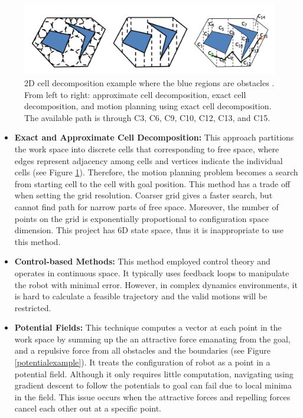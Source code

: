 \begin{figure}[H]
\centering
\includegraphics[width = \columnwidth]{background/cell.png}
\caption{2D cell decomposition example where the blue regions are obstacles \citep{celldecom}. From left to right: approximate cell decomposition, exact cell decomposition, and motion planning using exact cell decomposition. The available path is through C3, C6, C9, C10, C12, C13, and C15.}
\label{cell}
\end{figure}

\begin{itemize}
    \item \textbf{Exact and Approximate Cell Decomposition:} This approach partitions the work space into discrete cells that corresponding to free space, where edges represent adjacency among cells and vertices indicate the individual cells (see Figure \ref{cell}). Therefore, the motion planning problem becomes a search from starting cell to the cell with goal position. This method has a trade off when setting the grid resolution. Coarser grid gives a faster search, but cannot find path for narrow parts of free space. Moreover, the number of points on the grid is exponentially proportional to configuration space dimension. This project has 6D state space, thus it is inappropriate to use this method.

    \item \textbf{Control-based Methods:} This method employed control theory and operates in continuous space. It typically uses feedback loops to manipulate the robot with minimal error. However, in complex dynamics environments, it is hard to calculate a feasible trajectory and the valid motions will be restricted.

    \item \textbf{Potential Fields:} This technique computes a vector at each point in the work space by summing up the an attractive force emanating from the goal, and a repulsive force from all obstacles and the boundaries (see Figure \ref{potentialexample}). It treats the configuration of robot as a point in a potential field. Although it only requires little computation, navigating using gradient descent to follow the potentials to goal can fail due to local minima in the field. This issue occurs when the attractive forces and repelling forces cancel each other out at a specific point.
\end{itemize}

